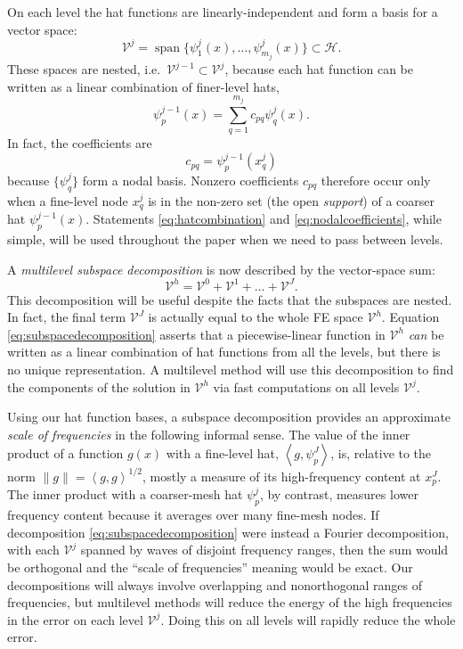 \documentclass[letterpaper,final,12pt,reqno]{amsart}
\theoremstyle{claim}
\newcommand{\ip}[2]{\left<#1,#2\right>}
\numberwithin{equation}{section}
\numberwithin{figure}{section}
\numberwithin{table}{section}
\numberwithin{theorem}{section}
\begin{document}
On each level the hat functions are linearly-independent and form a basis for a vector space:
\begin{equation}
  \mathcal{V}^j = \operatorname{span}\{\psi_1^j(x),\dots,\psi_{m_j}^j(x)\} \subset \mathcal{H}.  \label{eq:definevk}
\end{equation}
These spaces are nested, i.e.~$\mathcal{V}^{j-1} \subset \mathcal{V}^j$, because each hat function can be written as a linear combination of finer-level hats,
\begin{equation}
   \psi_p^{j-1}(x) = \sum_{q=1}^{m_j} c_{pq} \psi_q^j(x). \label{eq:hatcombination}
\end{equation}
In fact, the coefficients are
\begin{equation}
  c_{pq} = \psi_p^{j-1}(x_q^j) \label{eq:nodalcoefficients}
\end{equation}
because $\{\psi_q^j\}$ form a nodal basis.  Nonzero coefficients $c_{pq}$ therefore occur only when a fine-level node $x_q^j$ is in the non-zero set (the open \emph{support}) of a coarser hat $\psi_p^{j-1}(x)$.  Statements \eqref{eq:hatcombination} and \eqref{eq:nodalcoefficients}, while simple, will be used throughout the paper when we need to pass between levels.

A \emph{multilevel subspace decomposition} is now described by the vector-space sum:
\begin{equation}
  \mathcal{V}^h = \mathcal{V}^0 + \mathcal{V}^1 + \dots + \mathcal{V}^J. \label{eq:subspacedecomposition}
\end{equation}
This decomposition will be useful despite the facts that the subspaces are nested.  In fact, the final term $\mathcal{V}^J$ is actually equal to the whole FE space $\mathcal{V}^h$.  Equation \eqref{eq:subspacedecomposition} asserts that a piecewise-linear function in $\mathcal{V}^h$ \emph{can} be written as a linear combination of hat functions from all the levels, but there is no unique representation.  A multilevel method will use this decomposition to find the components of the solution in $\mathcal{V}^h$ via fast computations on all levels $\mathcal{V}^j$.

Using our hat function bases, a subspace decomposition provides an approximate \emph{scale of frequencies} in the following informal sense.  The value of the inner product of a function $g(x)$ with a fine-level hat, $\ip{g}{\psi_p^J}$, is, relative to the norm $\|g\| = \ip{g}{g}^{1/2}$, mostly a measure of its high-frequency content at $x_p^J$.  The inner product with a coarser-mesh hat $\psi_p^j$, by contrast, measures lower frequency content because it averages over many fine-mesh nodes.  If decomposition \eqref{eq:subspacedecomposition} were instead a Fourier decomposition, with each $\mathcal{V}^j$ spanned by waves of disjoint frequency ranges, then the sum would be orthogonal and the ``scale of frequencies'' meaning would be exact.  Our decompositions will always involve overlapping and nonorthogonal ranges of frequencies, but multilevel methods will reduce the energy of the high frequencies in the error on each level $\mathcal{V}^j$.  Doing this on all levels will rapidly reduce the whole error.
\end{document}
